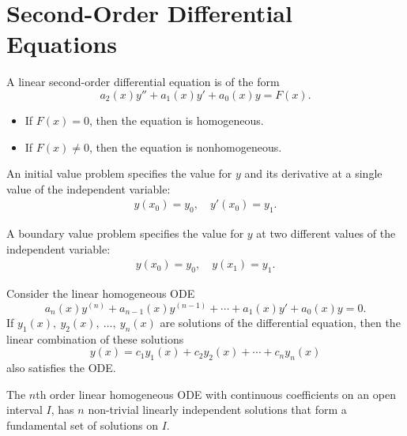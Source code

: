 \documentclass{article}
\begin{document}
\section{Second-Order Differential Equations}
A linear second-order differential equation is of the form
\begin{equation*}
    a_2\left( x \right)y'' + a_1\left( x \right)y' + a_0\left( x \right)y = F\left( x \right).
\end{equation*}
\begin{itemize}
    \item If \(F\left( x \right) = 0\), then the equation is
          homogeneous.
    \item If \(F\left( x \right) \neq 0\), then the equation is
          nonhomogeneous.
\end{itemize}
\begin{definition}
    An initial value problem specifies the value for \(y\) and its
    derivative at a single value of the independent variable:
    \begin{align*}
        y\left( x_0 \right) = y_0, \quad y'\left( x_0 \right) = y_1.
    \end{align*}
\end{definition}
\begin{definition}
    A boundary value problem specifies the value for \(y\) at two
    different values of the independent variable:
    \begin{align*}
        y\left( x_0 \right) = y_0, \quad y\left( x_1 \right) = y_1.
    \end{align*}
\end{definition}
\begin{theorem}
    Consider the linear homogeneous ODE
    \begin{equation*}
        a_n\left( x \right)y^{\left( n \right)} + a_{n-1}\left( x \right)y^{\left( n-1 \right)} + \cdots + a_1\left( x \right)y' + a_0\left( x \right)y = 0.
    \end{equation*}
    If \(y_1\left( x \right),\: y_2\left( x \right),\: \dots ,\: y_n\left( x \right)\) are solutions of the
    differential equation, then the linear combination of these
    solutions
    \begin{equation*}
        y\left( x \right) = c_1 y_1\left( x \right) + c_2 y_2\left( x \right) + \cdots + c_n y_n\left( x \right)
    \end{equation*}
    also satisfies the ODE\@.
\end{theorem}
\begin{theorem}
    The \(n\)th order linear homogeneous ODE with \linebreak continuous
    coefficients on an open interval \(I\), has \(n\) non-trivial
    linearly independent solutions that form a fundamental set of
    solutions on \(I\).
\end{theorem}
\end{document}
